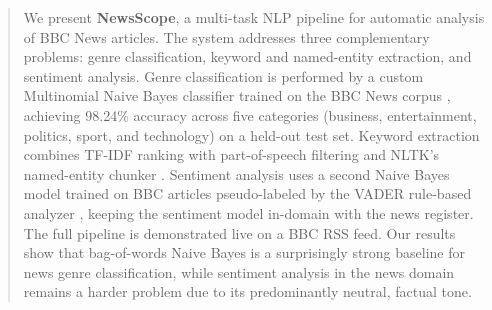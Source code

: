 \begin{abstract}
We present \textbf{NewsScope}, a multi-task NLP pipeline for automatic analysis of BBC News articles. The system addresses three complementary problems: genre classification, keyword and named-entity extraction, and sentiment analysis. Genre classification is performed by a custom Multinomial Naive Bayes classifier trained on the BBC News corpus \cite{greene2006practical}, achieving 98.24\% accuracy across five categories (business, entertainment, politics, sport, and technology) on a held-out test set. Keyword extraction combines TF-IDF ranking with part-of-speech filtering and NLTK's named-entity chunker \cite{bird2009natural}. Sentiment analysis uses a second Naive Bayes model trained on BBC articles pseudo-labeled by the VADER rule-based analyzer \cite{hutto2014vader}, keeping the sentiment model in-domain with the news register. The full pipeline is demonstrated live on a BBC RSS feed. Our results show that bag-of-words Naive Bayes is a surprisingly strong baseline for news genre classification, while sentiment analysis in the news domain remains a harder problem due to its predominantly neutral, factual tone.
\end{abstract}
